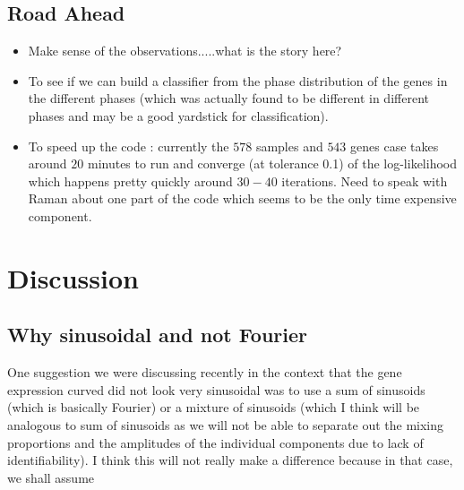 \documentclass[11pt]{article}
\begin{document}
\subsection{Road Ahead}

\begin{itemize}

\item Make sense of the observations.....what is the story here?



\item To see if we can build a classifier from the phase distribution of the genes in the different phases (which was actually found to be different in different phases and may be a good yardstick for classification).

\item To speed up the code : currently the $578$ samples and $543$ genes case takes around $20$ minutes to run and converge (at tolerance 0.1) of the log-likelihood which happens pretty quickly around $30-40$ iterations. Need to speak with Raman about one part of the code which seems to be the only time expensive component.
\end{itemize}




\section{Discussion}

\subsection{Why sinusoidal and not Fourier}

One suggestion we were discussing recently in the context that the gene expression curved did not look very sinusoidal was to use  a sum of sinusoids (which is basically Fourier) or a mixture of sinusoids (which I think will be analogous to sum of sinusoids as we will not be able to separate out the mixing proportions and the amplitudes of the individual components due to lack of identifiability). I think this will not really make a difference because in that case, we shall assume
\end{document}
